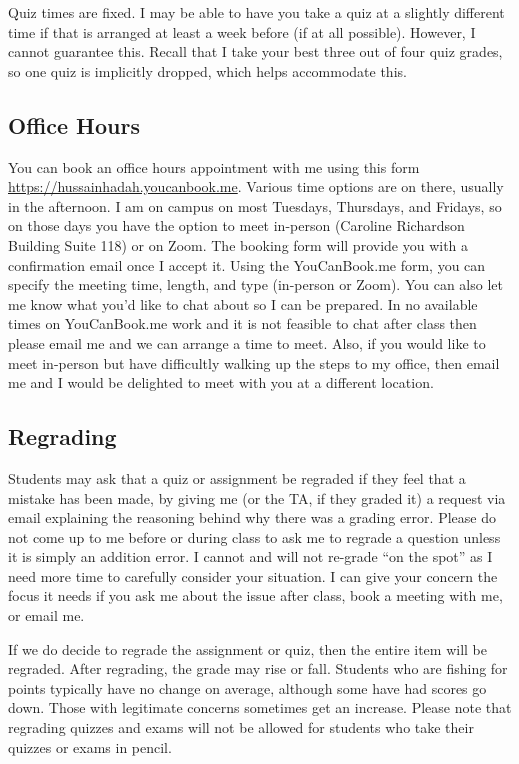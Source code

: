 \documentclass[11pt,letterpaper,final]{article}
\begin{document}
Quiz times are fixed. I may be able to have you take a quiz at a slightly different time if that is arranged at least a week before (if at all possible). However, I cannot guarantee this. Recall that I take your best three out of four quiz grades, so one quiz is implicitly dropped, which helps accommodate this. 

\subsection{Office Hours}
You can book an office hours appointment with me using this form \url{https://hussainhadah.youcanbook.me}. Various time options are on there, usually in the afternoon. I am on campus on most Tuesdays, Thursdays, and Fridays, so on those days you have the option to meet in-person (Caroline Richardson Building Suite 118) or on Zoom.  The booking form will provide you with a confirmation email once I accept it. Using the YouCanBook.me form, you can specify the meeting time, length, and type (in-person or Zoom). You can also let me know what you'd like to chat about so I can be prepared. In no available times on YouCanBook.me work and it is not feasible to chat after class then please email me and we can arrange a time to meet. Also, if you would like to meet in-person but have difficultly walking up the steps to my office, then email me and I would be delighted to meet with you at a different location.
 
\subsection{Regrading}
Students may ask that a quiz or assignment be regraded if they feel that a mistake has been made, by giving me (or the TA, if they graded it) a request via email explaining the reasoning behind why there was a grading error. Please do not come up to me before or during class to ask me to regrade a question unless it is simply an addition error. I cannot and will not re-grade ``on the spot'' as I need more time to carefully consider your situation. I can give your concern the focus it needs if you ask me about the issue after class, book a meeting with me, or email me.

If we do decide to regrade the assignment or quiz, then the entire item will be regraded. After regrading, the grade may rise or fall. Students who are fishing for points typically have no change on average, although some have had scores go down. Those with legitimate concerns sometimes get an increase. Please note that regrading quizzes and exams will not be allowed for students who take their quizzes or exams in pencil.
\end{document}
